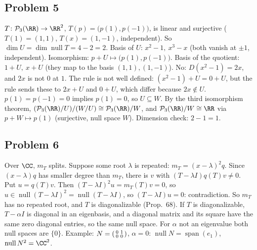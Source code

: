 \documentclass[10pt]{scrartcl}
\DeclareMathOperator{\nul}{null}
\DeclareMathOperator{\spn}{span}
\newcommand{\PP}{\mathcal P}
\begin{document}
\subsection*{Problem 5}
\begin{enumerate}[(a)]
  \ii $T\colon\PP_3(\RR)\to\RR^2$, $T(p)=\big(p(1),p(-1)\big)$, is linear and surjective ($T(1)=(1,1)$, $T(x)=(1,-1)$, independent). So $\dim U=\dim\nul T=4-2=2$. Basis of $U$: $x^2-1,\ x^3-x$ (both vanish at $\pm1$, independent). Isomorphism: $p+U\mapsto\big(p(1),p(-1)\big)$. Basis of the quotient: $1+U,\ x+U$ (they map to the basis $(1,1),(1,-1)$).
  \ii No: $D(x^2-1)=2x$, and $2x$ is not $0$ at $1$. The rule is not well defined: $(x^2-1)+U=0+U$, but the rule sends these to $2x+U$ and $0+U$, which differ because $2x\notin U$.
  \ii $p(1)=p(-1)=0$ implies $p(1)=0$, so $U\subseteq W$. By the third isomorphism theorem, $(\PP_3(\RR)/U)/(W/U)\cong\PP_3(\RR)/W$, and $\PP_3(\RR)/W\cong\RR$ via $p+W\mapsto p(1)$ (surjective, null space $W$). Dimension check: $2-1=1$.
\end{enumerate}

\subsection*{Problem 6}
\begin{enumerate}[(a)]
  \ii Over $\CC$, $m_T$ splits. Suppose some root $\lambda$ is repeated: $m_T=(x-\lambda)^2q$. Since $(x-\lambda)q$ has smaller degree than $m_T$, there is $v$ with $(T-\lambda I)q(T)v\ne0$. Put $u=q(T)v$. Then $(T-\lambda I)^2u=m_T(T)v=0$, so $u\in\nul(T-\lambda I)^2=\nul(T-\lambda I)$, so $(T-\lambda I)u=0$: contradiction. So $m_T$ has no repeated root, and $T$ is diagonalizable (Prop.~68).
  \ii If $T$ is diagonalizable, $T-\alpha I$ is diagonal in an eigenbasis, and a diagonal matrix and its square have the same zero diagonal entries, so the same null space.
  \ii For $\alpha$ not an eigenvalue both null spaces are $\{0\}$. Example: $N=\begin{psmallmatrix}0&1\\0&0\end{psmallmatrix}$, $\alpha=0$: $\nul N=\spn(e_1)$, $\nul N^2=\CC^2$.
\end{enumerate}
\end{document}
